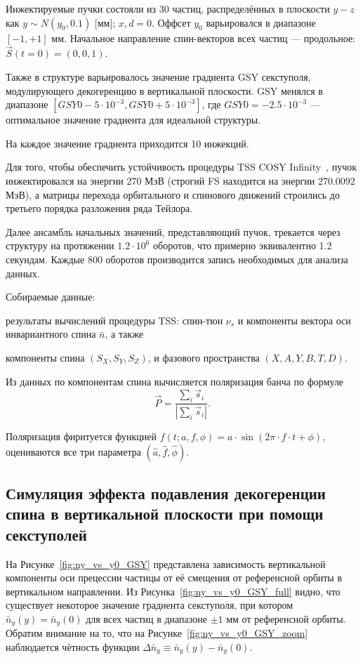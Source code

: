 Инжектируемые пучки состояли из 30 частиц, распределённых в
плоскости $y-z$ как $y\sim N(y_0, 0.1)$ [мм]; $x,d =
0$. Оффсет $y_0$ варьировался в диапазоне $[-1, +1]$ мм. Начальное
направление спин-векторов всех частиц --- продольное: $\vec S(t=0) = (0,0,1)$.

Также в структуре варьировалось значение градиента GSY секступоля,
модулирующего декогеренцию в вертикальной плоскости. GSY менялся в
диапазоне $[GSY0 - 5\cdot10^{-3}, GSY0 + 5\cdot10^{-3}]$, где
$GSY0=-2.5\cdot 10^{-3}$ --- оптимальное значение градиента для идеальной структуры.

На каждое значение градиента приходится 10 инжекций.

Для того, чтобы обеспечить устойчивость процедуры TSS COSY Infinity~\cite{COSYINF:BeamPhysMan}, пучок инжектировался на энергии 270 МэВ (строгий FS находится на энергии 270.0092 МэВ), а матрицы перехода орбитального и спинового движений строились до третьего порядка разложения ряда Тейлора. 

Далее ансамбль начальных значений, представляющий пучок, трекается
через структуру на протяжении $1.2\cdot10^6$ оборотов, что
примерно эквивалентно 1.2 секундам. Каждые 800 оборотов производится
запись необходимых для анализа данных.

Собираемые данные: 
\begin{enumerate*}
	\item результаты вычислений процедуры TSS: спин-тюн $\nu_s$ и компоненты вектора оси инвариантного спина $\bar n$, а также
	\item компоненты спина $(S_X, S_Y, S_Z)$, и фазового пространства $(X,A,Y,B,T,D)$.
\end{enumerate*}

Из данных по компонентам спина вычисляется поляризация банча по
формуле
\begin{equation}\label{eq:polarization_formula}
\vec P = \frac{\sum_i\vec s_i}{|\sum_i\vec s_i|}.
\end{equation}

Поляризация фиритуется функцией $f(t; a,f,\phi) = a\cdot \sin(2\pi\cdot
f\cdot t + \phi)$, оцениваются все три параметра $(\hat a, \hat f,
\hat\phi)$. 

\subsection{Симуляция эффекта подавления декогеренции спина в вертикальной плоскости при помощи секступолей}
На Рисунке~\ref{fig:ny_vs_y0_GSY} представлена зависимость вертикальной компоненты оси прецессии частицы от её смещения от референсной орбиты в вертикальном направлении. Из Рисунка~\ref{fig:ny_vs_y0_GSY_full} видно, что существует некоторое значение градиента секступоля, при котором $\bar n_y(y) = \bar n_y(0)$ для всех частиц в диапазоне $\pm 1$ мм от референсной орбиты. Обратим внимание на то, что на Рисунке~\ref{fig:ny_vs_y0_GSY_zoom} наблюдается чётность функции $\Delta\bar n_y \equiv \bar n_y(y) - \bar n_y(0)$.

